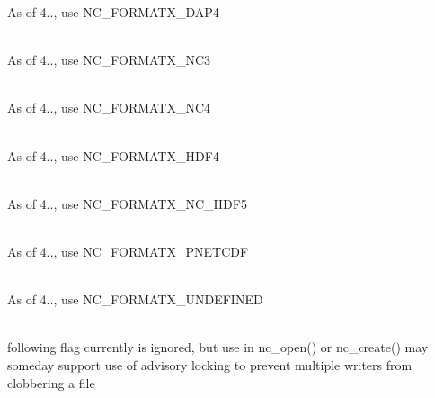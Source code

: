 \begin{DoxyRefList}
\label{deprecated__deprecated000146}%
%
As of 4.., use NC\+\_\+\+FORMATX\+\_\+\+DAP4  
\item[{\parbox[t]{\linewidth}{Member \doxylink{netcdf_8h_af878ee5cf4415fe53c4cda02fa64bd18}{NC\+\_\+\+FORMAT\+\_\+\+NC3} }}]\hfill \\
\label{deprecated__deprecated000140}%
%
As of 4.., use NC\+\_\+\+FORMATX\+\_\+\+NC3  
\item[{\parbox[t]{\linewidth}{Member \doxylink{netcdf_8h_a52eec5da9683fc891855964b5ac062ce}{NC\+\_\+\+FORMAT\+\_\+\+NC4} }}]\hfill \\
\label{deprecated__deprecated000142}%
%
As of 4.., use NC\+\_\+\+FORMATX\+\_\+\+NC4  
\item[{\parbox[t]{\linewidth}{Member \doxylink{netcdf_8h_af8d14fd6d930eeda0cade3079ae757e4}{NC\+\_\+\+FORMAT\+\_\+\+NC\+\_\+\+HDF4} }}]\hfill \\
\label{deprecated__deprecated000143}%
%
As of 4.., use NC\+\_\+\+FORMATX\+\_\+\+HDF4  
\item[{\parbox[t]{\linewidth}{Member \doxylink{netcdf_8h_ac6b98dfc20c66770293cf1f8347f6204}{NC\+\_\+\+FORMAT\+\_\+\+NC\+\_\+\+HDF5} }}]\hfill \\
\label{deprecated__deprecated000141}%
%
As of 4.., use NC\+\_\+\+FORMATX\+\_\+\+NC\+\_\+\+HDF5  
\item[{\parbox[t]{\linewidth}{Member \doxylink{netcdf_8h_a2d0b3cde7862db1333a3b9142369862c}{NC\+\_\+\+FORMAT\+\_\+\+PNETCDF} }}]\hfill \\
\label{deprecated__deprecated000144}%
%
As of 4.., use NC\+\_\+\+FORMATX\+\_\+\+PNETCDF  
\item[{\parbox[t]{\linewidth}{Member \doxylink{netcdf_8h_adf5f20dbf02f1230c086b7db8a441122}{NC\+\_\+\+FORMAT\+\_\+\+UNDEFINED} }}]\hfill \\
\label{deprecated__deprecated000147}%
%
As of 4.., use NC\+\_\+\+FORMATX\+\_\+\+UNDEFINED  
\item[{\parbox[t]{\linewidth}{Member \doxylink{netcdf_8h_aaaa2d7be154d15243addd2e7520a1034}{NC\+\_\+\+LOCK} }}]\hfill \\
\label{deprecated__deprecated000135}%
%
 following flag currently is ignored, but use in nc\+\_\+open() or nc\+\_\+create() may someday support use of advisory locking to prevent multiple writers from clobbering a file  

\end{DoxyRefList}
